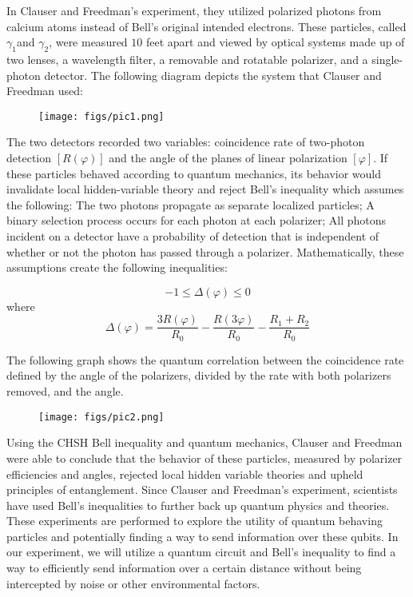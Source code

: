 \documentclass{article}
\begin{document}
In Clauser and Freedman’s experiment, they utilized polarized photons from calcium atoms instead of Bell’s original intended electrons. These particles, called $\gamma_1$and $\gamma_2$, were measured $10$ feet apart and viewed by optical systems made up of two lenses, a wavelength filter, a removable and rotatable polarizer, and a single-photon detector. The following diagram depicts the system that Clauser and Freedman used: 

\begin{figure}
    \centering
    \texttt{[image: figs/pic1.png]}
    \caption{}
    \label{fig:system-diagram}
\end{figure}

The two detectors recorded two variables: coincidence rate of two-photon detection $[R(\varphi)]$ and the angle of the planes of linear polarization $[\varphi]$. If these particles behaved according to quantum mechanics, its behavior would invalidate local hidden-variable theory and reject Bell’s inequality which assumes the following: The two photons propagate as separate localized particles; A binary selection process occurs for each photon at each polarizer; All photons incident on a detector have a probability of detection that is independent of whether or not the photon has passed through a polarizer. Mathematically, these assumptions create the following inequalities:

$$-1 \leq \Delta(\varphi) \leq 0$$
where
$$\Delta(\varphi) = \frac{3R(\varphi)}{R_0} - \frac{R(3\varphi)}{R_0} - \frac{R_1+R_2}{R_0}$$

The following graph shows the quantum correlation between the coincidence rate defined by the angle of the polarizers, divided by the rate with both polarizers removed, and the angle. 

\begin{figure}
    \centering
    \texttt{[image: figs/pic2.png]}
    \caption{}
    \label{fig:angles-graph}
\end{figure}

Using the CHSH Bell inequality and quantum mechanics, Clauser and Freedman were able to conclude that the behavior of these particles, measured by polarizer efficiencies and angles, rejected local hidden variable theories and upheld principles of entanglement. 
Since Clauser and Freedman’s experiment, scientists have used Bell’s inequalities to further back up quantum physics and theories. These experiments are performed to explore the utility of quantum behaving particles and potentially finding a way to send information over these qubits. In our experiment, we will utilize a quantum circuit and Bell’s inequality to find a way to efficiently send information over a certain distance without being intercepted by noise or other environmental factors. 
\end{document}
